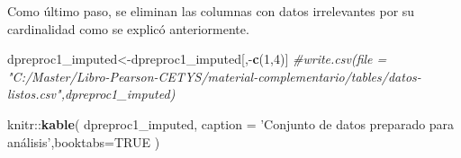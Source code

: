 \documentclass[]{book}
\newenvironment{Shaded}{\begin{snugshade}}{\end{snugshade}}
\newcommand{\KeywordTok}[1]{\textcolor[rgb]{0.13,0.29,0.53}{\textbf{{#1}}}}
\newcommand{\DataTypeTok}[1]{\textcolor[rgb]{0.13,0.29,0.53}{{#1}}}
\newcommand{\DecValTok}[1]{\textcolor[rgb]{0.00,0.00,0.81}{{#1}}}
\newcommand{\StringTok}[1]{\textcolor[rgb]{0.31,0.60,0.02}{{#1}}}
\newcommand{\CommentTok}[1]{\textcolor[rgb]{0.56,0.35,0.01}{\textit{{#1}}}}
\newcommand{\OtherTok}[1]{\textcolor[rgb]{0.56,0.35,0.01}{{#1}}}
\newcommand{\NormalTok}[1]{{#1}}
\begin{document}
Como último paso, se eliminan las columnas con datos irrelevantes por su
cardinalidad como se explicó anteriormente.

\begin{Shaded}
\begin{Highlighting}[]
\NormalTok{dpreproc1_imputed<-dpreproc1_imputed[,-}\KeywordTok{c}\NormalTok{(}\DecValTok{1}\NormalTok{,}\DecValTok{4}\NormalTok{)]}
\CommentTok{#write.csv(file = "C:/Master/Libro-Pearson-CETYS/material-complementario/tables/datos-listos.csv",dpreproc1_imputed)}
\end{Highlighting}
\end{Shaded}

\begin{Shaded}
\begin{Highlighting}[]
\NormalTok{knitr::}\KeywordTok{kable}\NormalTok{(}
  \NormalTok{dpreproc1_imputed,}
  \DataTypeTok{caption =} \StringTok{'Conjunto de datos preparado para análisis'}\NormalTok{,}\DataTypeTok{booktabs=}\OtherTok{TRUE}
\NormalTok{)}
\end{Highlighting}
\end{Shaded}
\end{document}

